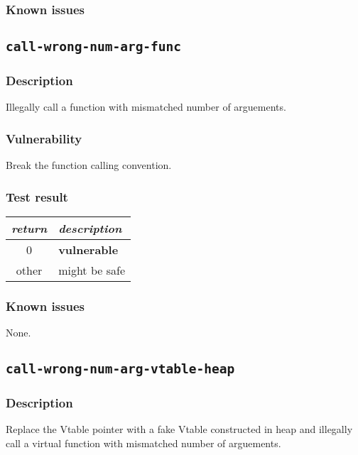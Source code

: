 \documentclass[a4paper]{book}
\begin{document}
\subsubsection{Known issues}

\newpage
\subsection{\texttt{call-wrong-num-arg-func}}\label{test-call-wrong-num-arg-func}

\subsubsection{Description}
Illegally call a function with mismatched number of arguements.

\subsubsection{Vulnerability}
Break the function calling convention.

\subsubsection{Test result}
\begin{tabular}{cl}
  \toprule
  \emph{return}  & \emph{description} \\
  \midrule
  0              & \textbf{vulnerable} \\
  other          & might be safe \\
  \bottomrule
\end{tabular}

\subsubsection{Known issues}
None.

\newpage

\subsection{\texttt{call-wrong-num-arg-vtable-heap}}\label{test-call-wrong-num-arg-vtable-heap}

\subsubsection{Description}
Replace the Vtable pointer with a fake Vtable constructed in heap and
illegally call a virtual function with mismatched number of arguements.
\end{document}
